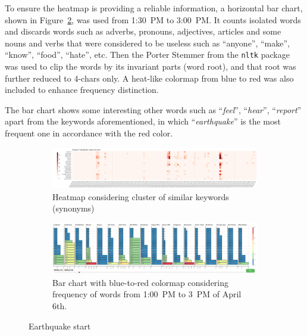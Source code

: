 To ensure the heatmap is providing a reliable information, a horizontal bar
chart, shown in Figure~\ref{fig:eq_start_hbar}, was used from 1:30~PM to 
3:00~PM. It counts isolated 
words and discards words such as adverbs, pronouns, adjectives, articles and 
some nouns and verbs that were considered to be useless such as ``anyone'',
``make'', ``know'', ``food'', ``hate'', etc. Then the Porter Stemmer from the
\texttt{nltk} package was used to clip the words by its invariant parts (word 
root), and that root was further reduced to 4-chars only. A heat-like colormap
from blue to red was also included to enhance frequency distinction. 

The bar chart shows some interesting other words such as ``\emph{feel}'',
``\emph{hear}'', ``\emph{report}'' apart from the keywords aforementioned, in
which ``\emph{earthquake}'' is the most frequent one in accordance with the red
color.

\begin{figure}[!h]
    \centering
    \begin{subfigure}[!h]{0.95\textwidth}
        \centering
        \includegraphics[width=1.00\textwidth]{figs/q1/eq_start_heat.png}
        \caption{Heatmap considering cluster of similar keywords (synonyms)}
        \label{fig:eq_start_heat}
    \vspace{12pt}
    \end{subfigure}
    \begin{subfigure}[!h]{0.95\textwidth}
        \centering
        \includegraphics[width=1.00\textwidth]{figs/q1/eq_start_hbar.png}
        \caption{Bar chart with blue-to-red colormap considering frequency of
        words from 1:00~PM to 3~PM of April 6th.}
        \label{fig:eq_start_hbar}
    \end{subfigure}
    \caption{Earthquake start}
    \label{fig:eq_start}
\end{figure}


